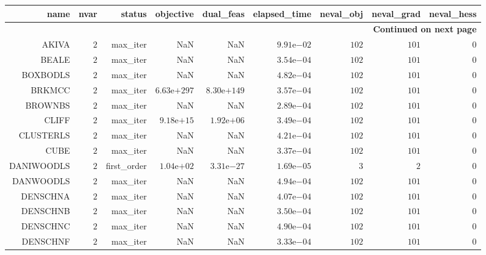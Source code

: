 \begin{longtable}{rrrrrrrrr}
\hline
name & nvar & status & objective & dual\_feas & elapsed\_time & neval\_obj & neval\_grad & neval\_hess \\\hline
\endhead
\hline
\multicolumn{9}{r}{{\bfseries Continued on next page}}\\
\hline
\endfoot
\endlastfoot
AKIVA & \(     2\) & max\_iter &       NaN &       NaN & \( 9.91\)e\(-02\) & \(   102\) & \(   101\) & \(     0\) \\
BEALE & \(     2\) & max\_iter &       NaN &       NaN & \( 3.54\)e\(-04\) & \(   102\) & \(   101\) & \(     0\) \\
BOXBODLS & \(     2\) & max\_iter &       NaN &       NaN & \( 4.82\)e\(-04\) & \(   102\) & \(   101\) & \(     0\) \\
BRKMCC & \(     2\) & max\_iter & \(6.63\)e\(+297\) & \(8.30\)e\(+149\) & \( 3.57\)e\(-04\) & \(   102\) & \(   101\) & \(     0\) \\
BROWNBS & \(     2\) & max\_iter &       NaN &       NaN & \( 2.89\)e\(-04\) & \(   102\) & \(   101\) & \(     0\) \\
CLIFF & \(     2\) & max\_iter & \( 9.18\)e\(+15\) & \( 1.92\)e\(+06\) & \( 3.49\)e\(-04\) & \(   102\) & \(   101\) & \(     0\) \\
CLUSTERLS & \(     2\) & max\_iter &       NaN &       NaN & \( 4.21\)e\(-04\) & \(   102\) & \(   101\) & \(     0\) \\
CUBE & \(     2\) & max\_iter &       NaN &       NaN & \( 3.37\)e\(-04\) & \(   102\) & \(   101\) & \(     0\) \\
DANIWOODLS & \(     2\) & first\_order & \( 1.04\)e\(+02\) & \( 3.31\)e\(-27\) & \( 1.69\)e\(-05\) & \(     3\) & \(     2\) & \(     0\) \\
DANWOODLS & \(     2\) & max\_iter &       NaN &       NaN & \( 4.94\)e\(-04\) & \(   102\) & \(   101\) & \(     0\) \\
DENSCHNA & \(     2\) & max\_iter &       NaN &       NaN & \( 4.07\)e\(-04\) & \(   102\) & \(   101\) & \(     0\) \\
DENSCHNB & \(     2\) & max\_iter &       NaN &       NaN & \( 3.50\)e\(-04\) & \(   102\) & \(   101\) & \(     0\) \\
DENSCHNC & \(     2\) & max\_iter &       NaN &       NaN & \( 4.90\)e\(-04\) & \(   102\) & \(   101\) & \(     0\) \\
DENSCHNF & \(     2\) & max\_iter &       NaN &       NaN & \( 3.33\)e\(-04\) & \(   102\) & \(   101\) & \(     0\) \\

\end{longtable}
